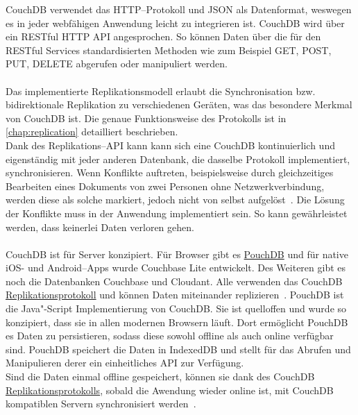 CouchDB verwendet das \gls{HTTP}--Protokoll und \gls{JSON} als Datenformat, weswegen es in jeder webfähigen Anwendung leicht zu integrieren ist.
CouchDB wird über ein \gls{REST}ful \gls{HTTP} \gls{API} angesprochen. So können Daten über die für den \gls{REST}ful Services standardisierten Methoden wie zum Beispiel GET, POST, PUT, DELETE abgerufen oder manipuliert werden.\\\\
%
%
Das implementierte Replikationsmodell erlaubt die Synchronisation bzw. bidirektionale Replikation zu verschiedenen Geräten, was das besondere Merkmal von CouchDB ist.
Die genaue Funktionsweise des Protokolls ist in \autoref{chap:replication} detailliert beschrieben.\\
% 
Dank des Replikations--\gls{API} kann kann sich eine CouchDB kontinuierlich und eigenständig mit jeder anderen Datenbank, die dasselbe Protokoll implementiert, synchronisieren.
Wenn Konflikte auftreten, beispielsweise durch gleichzeitiges Bearbeiten eines Dokuments von zwei Personen ohne Netzwerkverbindung, werden diese als solche markiert, jedoch nicht von selbst aufgelöst~\cite{couch}. Die Lösung der Konflikte muss in der Anwendung implementiert sein.
So kann gewährleistet werden, dass keinerlei Daten verloren gehen.\\\\
%
%
CouchDB ist für Server konzipiert. Für Browser gibt es \hyperref[chap:pouch]{PouchDB} und für native iOS- und Android--\glspl{App} wurde Couchbase Lite entwickelt.
Des Weiteren gibt es noch die Datenbanken Couchbase und Cloudant.
Alle verwenden das CouchDB \hyperref[chap:replication]{Replikationsprotokoll} und können Daten miteinander replizieren~\cite{couch}.
%
%
PouchDB ist die Java"-Script Implementierung von CouchDB.
Sie ist quelloffen und wurde so konzipiert, dass sie in allen modernen Browsern läuft. Dort ermöglicht PouchDB es Daten zu persistieren, sodass diese sowohl offline als auch online verfügbar sind.
PouchDB speichert die Daten in IndexedDB und stellt für das Abrufen und Manipulieren derer ein einheitliches \gls{API} zur Verfügung.\\
Sind die Daten einmal offline gespeichert, können sie dank des CouchDB \hyperref[chap:replication]{Replikationsprotokolls}, sobald die Awendung wieder online ist, mit CouchDB kompatiblen Servern synchronisiert werden~\cite{pouch}.